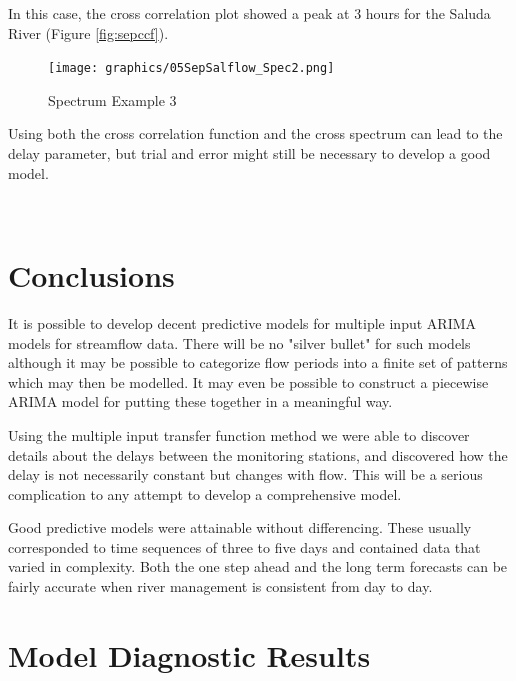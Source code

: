 \documentclass[12pt]{report}
\begin{document}
In this case, the cross correlation plot showed a peak at 3 hours
for the Saluda River (Figure \ref{fig:sepccf}).


\begin{figure}[h]\centering
\texttt{[image: graphics/05SepSalflow\_Spec2.png]}\caption{Spectrum Example 3}
\label{fig:05sepsalspect2}
\end{figure}

Using both the cross correlation function and the cross spectrum
can lead to the delay parameter, but trial and error might still
be necessary to develop a good model.

\clearpage\
\chapter{Conclusions} It is possible to develop decent predictive
models for multiple input ARIMA models for streamflow data.  There
will be no "silver bullet" for such models although it may be
possible to categorize flow periods into a finite set of patterns
which may then be modelled.  It may even be possible to construct
a piecewise ARIMA model for putting these together in a meaningful
way.

Using the multiple input transfer function method we were able to
discover details about the delays between the monitoring stations,
and discovered how the delay is not necessarily constant but
changes with flow.  This will be a serious complication to any
attempt to develop a comprehensive model.



Good predictive models were attainable without differencing. These
usually corresponded to time sequences of three to five days and
contained data that varied in complexity. Both the one step ahead
and the long term forecasts can be fairly accurate when river
management is consistent from day to day.






\appendix
\chapter{Model Diagnostic Results}
\end{document}
